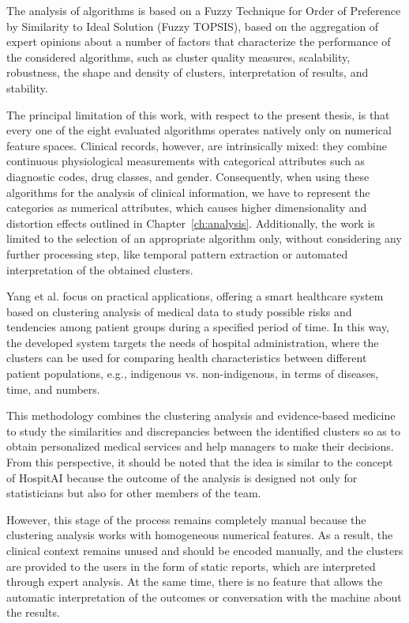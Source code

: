 The analysis of algorithms is based on a Fuzzy Technique for Order of Preference by Similarity to Ideal Solution (Fuzzy TOPSIS), based on the aggregation of expert opinions about a number of factors that characterize the performance of the considered algorithms, such as cluster quality measures, scalability, robustness, the shape and density of clusters, interpretation of results, and stability.

The principal limitation of this work, with respect to the present thesis, is that every one of the eight evaluated algorithms operates natively only on numerical feature spaces. Clinical records, however, are intrinsically mixed: they combine continuous physiological measurements with categorical attributes such as diagnostic codes, drug classes, and gender. Consequently, when using these algorithms for the analysis of clinical information, we have to represent the categories as numerical attributes, which causes higher dimensionality and distortion effects outlined in Chapter~\ref{ch:analysis}. Additionally, the work is limited to the selection of an appropriate algorithm only, without considering any further processing step, like temporal pattern extraction or automated interpretation of the obtained clusters.

Yang et al. \cite{yang2024} focus on practical applications, offering a smart healthcare system based on clustering analysis of medical data to study possible risks and tendencies among patient groups during a specified period of time. In this way, the developed system targets the needs of hospital administration, where the clusters can be used for comparing health characteristics between different patient populations, e.g., indigenous vs. non-indigenous, in terms of diseases, time, and numbers.

This methodology combines the clustering analysis and evidence-based medicine to study the similarities and discrepancies between the identified clusters so as to obtain personalized medical services and help managers to make their decisions. From this perspective, it should be noted that the idea is similar to the concept of HospitAI because the outcome of the analysis is designed not only for statisticians but also for other members of the team.

However, this stage of the process remains completely manual because the clustering analysis works with homogeneous numerical features. As a result, the clinical context remains unused and should be encoded manually, and the clusters are provided to the users in the form of static reports, which are interpreted through expert analysis. At the same time, there is no feature that allows the automatic interpretation of the outcomes or conversation with the machine about the results.

